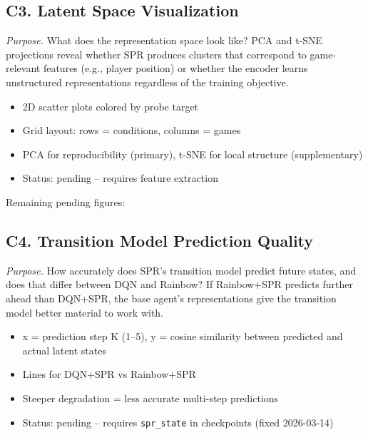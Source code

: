 \documentclass[11pt]{article}
\begin{document}
\vspace{0.5em}
\subsection*{C3. Latent Space Visualization}

\noindent\textit{Purpose.} What does the representation space
look like? PCA and t-SNE projections reveal whether SPR produces
clusters that correspond to game-relevant features (e.g., player
position) or whether the encoder learns unstructured
representations regardless of the training objective.

\begin{itemize}[leftmargin=2em, itemsep=0.1em, topsep=0.3em]
  \item 2D scatter plots colored by probe target
  \item Grid layout: rows = conditions, columns = games
  \item PCA for reproducibility (primary), t-SNE for local
    structure (supplementary)
  \item Status: pending -- requires feature extraction
\end{itemize}

\vspace{0.5em}
\noindent Remaining pending figures:

\subsection*{C4. Transition Model Prediction Quality}

\noindent\textit{Purpose.} How accurately does SPR's transition
model predict future states, and does that differ between DQN
and Rainbow? If Rainbow+SPR predicts further ahead than DQN+SPR,
the base agent's representations give the transition model
better material to work with.

\begin{itemize}[leftmargin=2em, itemsep=0.1em, topsep=0.3em]
  \item x = prediction step K (1--5), y = cosine similarity
    between predicted and actual latent states
  \item Lines for DQN+SPR vs Rainbow+SPR
  \item Steeper degradation = less accurate multi-step predictions
  \item Status: pending -- requires \texttt{spr\_state} in
    checkpoints (fixed 2026-03-14)
\end{itemize}
\end{document}
